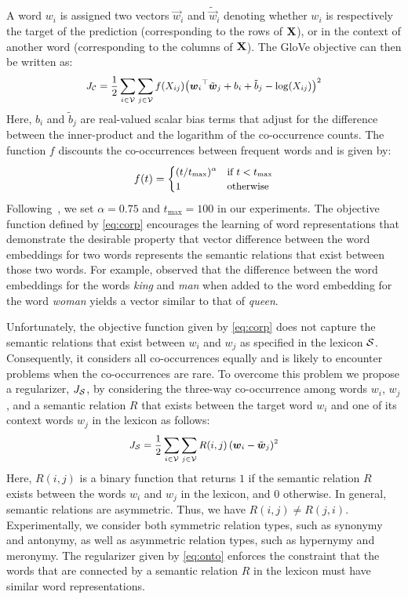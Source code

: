 \documentclass[letterpaper]{article}
\newcommand{\citet}[1]{\citeauthor{#1} \shortcite{#1}}
\begin{document}
A word $w_i$ is assigned two vectors $\vec{w}_i$ and $\tilde{\vec{w}}_i$ denoting whether $w_i$ is respectively
the target of the prediction  (corresponding to the rows of $\text{\bf X}$),
or in the context of another word (corresponding to the columns of $\text{\bf X}$).
The GloVe objective can then be written as:
\begin{equation}
\small
\label{eq:corp}
J_{\mathcal{C}} = \frac{1}{2} \sum_{i \in \mathcal{V}} \sum_{j \in \mathcal{V}} f(X_{ij}) {\left(\boldsymbol{w}_i{}^\top\tilde{\boldsymbol{w}}_j +b_i + \tilde{b}_j  - \log(X_{ij}) \right)}^2
\end{equation}
Here, $b_i$ and $\tilde{b}_j$ are real-valued scalar bias terms that adjust for
the difference between the inner-product and the logarithm of
the co-occurrence counts.
The function $f$ discounts the co-occurrences between frequent words and is given by:
\begin{equation}
\small
f(t) = \begin{cases} (t/t_{\max})^\alpha & \text{if $t < t_{\max}$} \\
				1 & \text{otherwise}
	\end{cases}
\end{equation}
Following~\cite{Pennington:EMNLP:2014}, we set $\alpha = 0.75$ and $t_{\max} = 100$ in our experiments.
The objective function defined by \eqref{eq:corp} encourages the learning of word representations that demonstrate the
desirable property that vector difference between the word embeddings for two words represents the semantic relations
that exist between those two words. For example, \citet{Mikolov:NAACL:2013} observed that
the difference between the word embeddings for the words \emph{king} and \emph{man} when added to the word embedding
for the word \emph{woman} yields a vector similar to that of \emph{queen}.

Unfortunately, the objective function given by \eqref{eq:corp} does not capture the semantic relations that exist between $w_i$ and $w_j$
as specified in the lexicon $\mathcal{S}$. Consequently, it considers all co-occurrences equally and is likely to encounter problems when the
co-occurrences are rare.
To overcome this problem we propose a regularizer, $J_{\mathcal{S}}$,  by considering the three-way co-occurrence
among words $w_i$, $w_j$, and a semantic relation $R$ that exists between the target word $w_i$ and
one of its context words $w_j$ in the lexicon as follows:
\begin{equation}
\small
\label{eq:onto}
J_{\mathcal{S}} = \frac{1}{2} \sum_{i \in \mathcal{V}}  \sum_{j \in \mathcal{V}} R(i,j) \left(\boldsymbol{w}_i - \tilde{\boldsymbol{w}}_j \right)^2
\end{equation}
Here, $R(i,j)$ is a binary function that returns $1$ if  the semantic relation $R$ exists between the words $w_i$ and $w_j$
in the lexicon, and $0$ otherwise.
In general, semantic relations are asymmetric. Thus, we have $R(i,j) \neq R(j,i)$.
Experimentally, we consider both symmetric relation types, such as synonymy and antonymy, as well as
asymmetric relation types, such as hypernymy and meronymy.
The regularizer given by \eqref{eq:onto} enforces the constraint that the words that are connected by a semantic relation $R$ in the
lexicon must have similar word representations.
\end{document}
